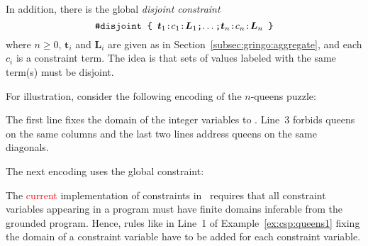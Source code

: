 In addition, there is the global \emph{disjoint constraint}
\[\texttt{\#disjoint~\{~$\boldsymbol{t}_1$:$c_1$:$\boldsymbol{L}_1$;$\dots$;$\boldsymbol{t}_n$:$c_n$:$\boldsymbol{L}_n$~\}}\]
where $n\geq 0$, $\boldsymbol{t}_i$ and $\boldsymbol{L}_i$ are given as in Section~\ref{subsec:gringo:aggregate},
and each $c_i$ is a constraint term.
%
The idea is that sets of values labeled with the same term(s) must be disjoint.

\begin{example}\label{ex:csp:queens1}
For illustration,
consider the following encoding of the $n$-queens puzzle:


The first line fixes the domain of the integer variables
 to .
Line~3 forbids queens on the same columns and the last two lines address queens on the same diagonals.
\end{example}

\begin{example}
The next encoding uses the global  constraint:
%
%

\end{example}

\begin{note}
The \textcolor{red}{current} implementation of constraints in \gringo\ requires 
that all constraint variables appearing in a program must have finite domains inferable from the grounded program.
Hence, rules like in Line~1 of Example~\ref{ex:csp:queens1} fixing the domain of a constraint variable have to be added for each constraint variable.
\end{note}


